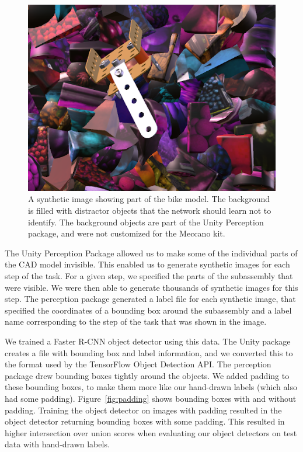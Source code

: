 \begin{figure}
  \includegraphics[width=\columnwidth]{figures/synthetic/perception_default.png}
  \caption[A synthetic image showing part of the bike model]{
    A synthetic image showing part of the bike model.
    The background is filled with distractor objects that the network should
    learn not to identify.
    The background objects are part of the Unity Perception package, and were
    not customized for the Meccano kit.
  }\label{fig:perception_default}
\end{figure}

The Unity Perception Package allowed us to make some of the individual parts of
the CAD model invisible.
This enabled us to generate synthetic images for each step of the task.
For a given step, we specified the parts of the subassembly that were visible.
We were then able to generate thousands of synthetic images for this step.
The perception package generated a label file for each synthetic image, that
specified the coordinates of a bounding box around the subassembly and a label
name corresponding to the step of the task that was shown in the image.

We trained a Faster R-CNN object detector using this data.
The Unity package creates a file with bounding box and label information, and
we converted this to the format used by the TensorFlow Object Detection API.
The perception package drew bounding boxes tightly around the objects.
We added padding to these bounding boxes, to make them more like our hand-drawn
labels (which also had some padding).
Figure~\ref{fig:padding} shows bounding boxes with and without padding.
Training the object detector on images with padding resulted in the object
detector returning bounding boxes with some padding.
This resulted in higher intersection over union scores when evaluating our
object detectors on test data with hand-drawn labels.

